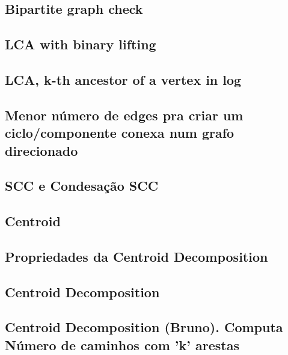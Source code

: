 \subsection{Bipartite graph check}


\subsection{LCA with binary lifting}


\subsection{LCA, k-th ancestor of a vertex in log}


\subsection{Menor número de edges pra criar um ciclo/componente conexa num grafo direcionado}


\subsection{SCC e Condesação SCC}


\subsection{Centroid}


\subsection{Propriedades da Centroid Decomposition}


\subsection{Centroid Decomposition}


\subsection{Centroid Decomposition (Bruno). Computa Número de caminhos com 'k' arestas}


